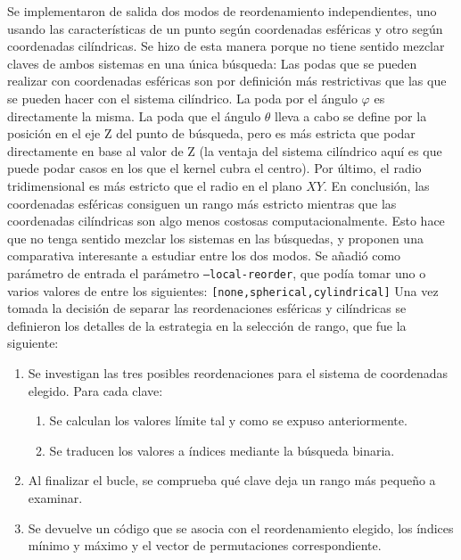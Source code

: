 Se implementaron de salida dos modos de reordenamiento independientes, uno usando las características de un punto según coordenadas esféricas y otro según coordenadas cilíndricas. Se hizo de esta manera porque no tiene sentido mezclar claves de ambos sistemas en una única búsqueda: Las podas que se pueden realizar con coordenadas esféricas son por definición más restrictivas que las que se pueden hacer con el sistema cilíndrico. La poda por el ángulo $\varphi$ es directamente la misma. La poda que el ángulo $\theta$ lleva a cabo se define por la posición en el eje Z del punto de búsqueda, pero es más estricta que podar directamente en base al valor de Z (la ventaja del sistema cilíndrico aquí es que puede podar casos en los que el kernel cubra el centro). Por último, el radio tridimensional es más estricto que el radio en el plano $XY$. En conclusión, las coordenadas esféricas consiguen un rango más estricto mientras que las coordenadas cilíndricas son algo menos costosas computacionalmente. Esto hace que no tenga sentido mezclar los sistemas en las búsquedas, y proponen una comparativa interesante a estudiar entre los dos modos. Se añadió como parámetro de entrada el parámetro \texttt{--local-reorder}, que podía tomar uno o varios valores de entre los siguientes: \texttt{[none,spherical,cylindrical]}
Una vez tomada la decisión de separar las reordenaciones esféricas y cilíndricas se definieron los detalles de la estrategia en la selección de rango, que fue la siguiente:
\begin{enumerate}
    \item Se investigan las tres posibles reordenaciones para el sistema de coordenadas elegido. Para cada clave:
    \begin{enumerate}
        \item Se calculan los valores límite tal y como se expuso anteriormente.
        \item Se traducen los valores a índices mediante la búsqueda binaria.
    \end{enumerate}
    \item Al finalizar el bucle, se comprueba qué clave deja un rango más pequeño a examinar.
    \item Se devuelve un código que se asocia con el reordenamiento elegido, los índices mínimo y máximo y el vector de permutaciones correspondiente.
\end{enumerate}


